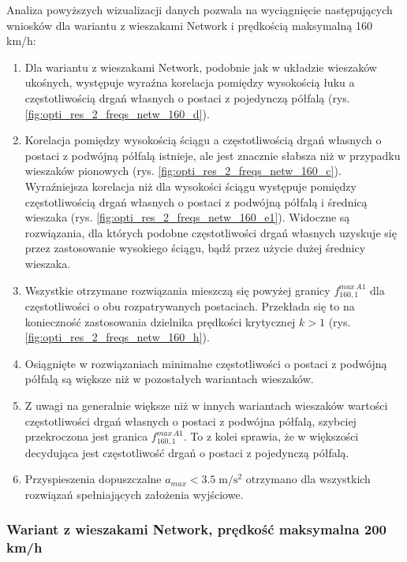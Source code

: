 Analiza powyższych wizualizacji danych pozwala na wyciągnięcie następujących wniosków dla wariantu z wieszakami Network i prędkością maksymalną 160 km/h:
\begin{enumerate}
	
	\item Dla wariantu z wieszakami Network, podobnie jak w układzie wieszaków ukośnych, występuje wyraźna korelacja pomiędzy wysokością łuku a częstotliwością drgań własnych o postaci z pojedynczą półfalą (rys. \ref{fig:opti_res_2_freqs_netw_160_d}).
	\item Korelacja pomiędzy wysokością ściągu a częstotliwością drgań własnych o postaci z podwójną półfalą istnieje, ale jest znacznie słabsza niż w przypadku wieszaków pionowych (rys. \ref{fig:opti_res_2_freqs_netw_160_c}). Wyraźniejsza korelacja niż dla wysokości ściągu występuje pomiędzy częstotliwością drgań własnych o postaci z podwójną półfalą i średnicą wieszaka (rys. \ref{fig:opti_res_2_freqs_netw_160_e1}). Widoczne są rozwiązania, dla których podobne częstotliwości drgań własnych uzyskuje się przez zastosowanie wysokiego ściągu, bądź przez użycie dużej średnicy wieszaka. 
	\item Wszystkie otrzymane rozwiązania mieszczą się powyżej granicy $f_{160,1}^{max\,A1}$ dla częstotliwości o obu rozpatrywanych postaciach. Przekłada się to na konieczność zastosowania dzielnika prędkości krytycznej $k>1$ (rys. \ref{fig:opti_res_2_freqs_netw_160_h}). 
	\item Osiągnięte w rozwiązaniach minimalne częstotliwości o postaci z podwójną półfalą są większe niż w pozostałych wariantach wieszaków.
	\item Z uwagi na generalnie większe niż w innych wariantach wieszaków wartości częstotliwości drgań własnych o postaci z podwójna półfalą, szybciej przekroczona jest granica $f_{160,1}^{max\,A1}$. To z kolei sprawia, że w większości decydująca jest częstotliwość drgań o postaci z pojedynczą półfalą.
	\item Przyspieszenia dopuszczalne $a_{max}<3.5\;\mathrm{m/s^2}$ otrzymano dla wszystkich rozwiązań spełniających założenia wyjściowe.
	
\end{enumerate}

\subsubsection{Wariant z wieszakami Network, prędkość maksymalna 200 km/h}


